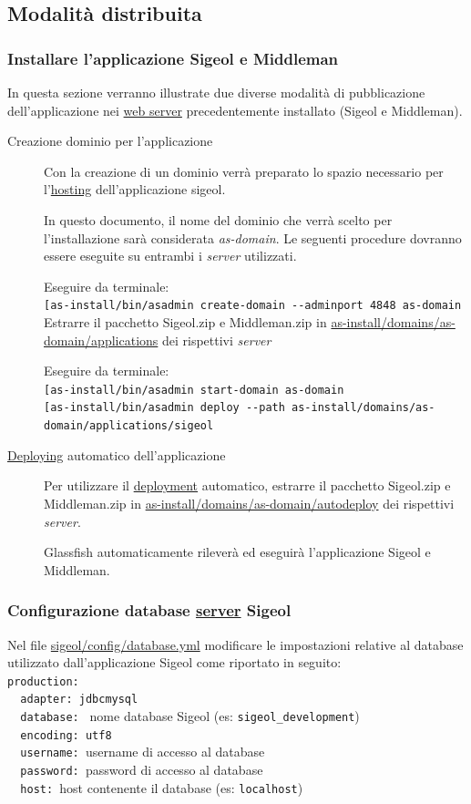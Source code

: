\documentclass[11pt,a4paper]{article}
\begin{document}
\subsection{Modalità distribuita}
\subsubsection{Installare l'applicazione Sigeol e Middleman}
In questa sezione verranno illustrate due diverse modalità di pubblicazione dell'applicazione nei \underline{web server} precedentemente installato (Sigeol e Middleman).
\begin{description}
 \item[Creazione dominio per l'applicazione]
Con la creazione di un dominio verrà preparato lo spazio necessario per l'\underline{hosting} dell'applicazione sigeol.

In questo documento, il nome del dominio che verrà scelto per l'installazione sarà considerata \textit{as-domain}.
Le seguenti procedure dovranno essere eseguite su entrambi i \textit{server} utilizzati.

Eseguire da terminale:\\
\verb|[as-install/bin/asadmin create-domain --adminport 4848 as-domain|
Estrarre il pacchetto Sigeol.zip e Middleman.zip in \url{as-install/domains/as-domain/applications} dei rispettivi \textit{server} 

Eseguire da terminale:\\
\verb|[as-install/bin/asadmin start-domain as-domain|\\
\verb|[as-install/bin/asadmin deploy --path as-install/domains/as-domain/applications/sigeol|

\item[\underline{Deploying} automatico dell'applicazione]
Per utilizzare il \underline{deployment} automatico, estrarre il pacchetto Sigeol.zip e Middleman.zip  in \url{as-install/domains/as-domain/autodeploy} dei rispettivi \textit{server}. 

Glassfish automaticamente rileverà ed eseguirà l'applicazione Sigeol e Middleman.
\end{description}

\subsubsection{Configurazione database \underline{server} Sigeol}
Nel file \url{sigeol/config/database.yml} modificare le impostazioni relative al database utilizzato dall'applicazione Sigeol come riportato in seguito:\\
\verb|production:| \\
\verb|  adapter: jdbcmysql |\\
\verb|  database: | nome database Sigeol (es: \verb|sigeol_development|)\\
\verb|  encoding: utf8 |\\
\verb|  username: |username di accesso al database\\
\verb|  password: |password di accesso al database\\
\verb|  host: |host contenente il database (es: \verb|localhost|)
\end{document}
